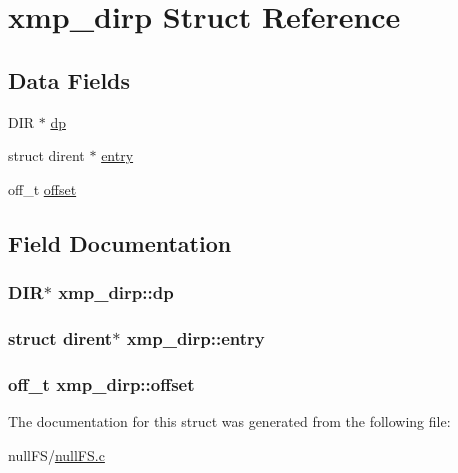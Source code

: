 \hypertarget{structxmp__dirp}{
\section{xmp\_\-dirp Struct Reference}
\label{structxmp__dirp}
}
\subsection*{Data Fields}
\begin{DoxyCompactItemize}
\item 
DIR $\ast$ \hyperlink{structxmp__dirp_a6fa4847468229f692f0cd9c99ebecb48}{dp}
\item 
struct dirent $\ast$ \hyperlink{structxmp__dirp_a2163ed949a86b2d304f6960ce40ada13}{entry}
\item 
off\_\-t \hyperlink{structxmp__dirp_a2a655b3c98a24497c3d2172547192785}{offset}
\end{DoxyCompactItemize}


\subsection{Field Documentation}
\hypertarget{structxmp__dirp_a6fa4847468229f692f0cd9c99ebecb48}{
\subsubsection[{dp}]{\setlength{\rightskip}{0pt plus 5cm}DIR$\ast$ {\bf xmp\_\-dirp::dp}}}
\label{structxmp__dirp_a6fa4847468229f692f0cd9c99ebecb48}
\hypertarget{structxmp__dirp_a2163ed949a86b2d304f6960ce40ada13}{
\subsubsection[{entry}]{\setlength{\rightskip}{0pt plus 5cm}struct dirent$\ast$ {\bf xmp\_\-dirp::entry}}}
\label{structxmp__dirp_a2163ed949a86b2d304f6960ce40ada13}
\hypertarget{structxmp__dirp_a2a655b3c98a24497c3d2172547192785}{
\subsubsection[{offset}]{\setlength{\rightskip}{0pt plus 5cm}off\_\-t {\bf xmp\_\-dirp::offset}}}
\label{structxmp__dirp_a2a655b3c98a24497c3d2172547192785}


The documentation for this struct was generated from the following file:\begin{DoxyCompactItemize}
\item 
nullFS/\hyperlink{nullFS_8c}{nullFS.c}\end{DoxyCompactItemize}
